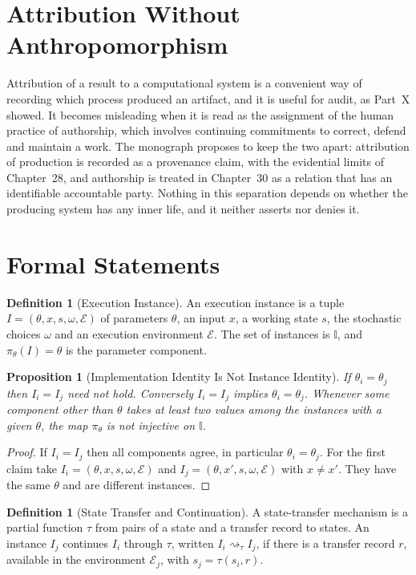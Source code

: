 \documentclass[11pt,letterpaper]{report}
\theoremstyle{plain}
\newtheorem{proposition}[theorem]{Proposition}
\theoremstyle{definition}
\newtheorem{definition}[theorem]{Definition}
\theoremstyle{remark}
\begin{document}
\section{Attribution Without Anthropomorphism}

Attribution of a result to a computational system is a convenient way of recording which process produced an artifact, and it is useful for audit, as Part~X showed. It becomes misleading when it is read as the assignment of the human practice of authorship, which involves continuing commitments to correct, defend and maintain a work. The monograph proposes to keep the two apart: attribution of production is recorded as a provenance claim, with the evidential limits of Chapter~28, and authorship is treated in Chapter~30 as a relation that has an identifiable accountable party. Nothing in this separation depends on whether the producing system has any inner life, and it neither asserts nor denies it.

\section{Formal Statements}

\begin{definition}[Execution Instance]\label{def:instance}
An execution instance is a tuple $I=(\theta,x,s,\omega,\mathcal E)$ of parameters $\theta$, an input $x$, a working state $s$, the stochastic choices $\omega$ and an execution environment $\mathcal E$. The set of instances is $\mathbb I$, and $\pi_\theta(I)=\theta$ is the parameter component.
\end{definition}

\begin{proposition}[Implementation Identity Is Not Instance Identity]\label{pr:implident}
If $\theta_i=\theta_j$ then $I_i=I_j$ need not hold. Conversely $I_i=I_j$ implies $\theta_i=\theta_j$. Whenever some component other than $\theta$ takes at least two values among the instances with a given $\theta$, the map $\pi_\theta$ is not injective on $\mathbb I$.
\end{proposition}
\begin{proof}
If $I_i=I_j$ then all components agree, in particular $\theta_i=\theta_j$. For the first claim take $I_i=(\theta,x,s,\omega,\mathcal E)$ and $I_j=(\theta,x',s,\omega,\mathcal E)$ with $x\ne x'$. They have the same $\theta$ and are different instances.
\end{proof}

\begin{definition}[State Transfer and Continuation]\label{def:continuation}
A state-transfer mechanism is a partial function $\tau$ from pairs of a state and a transfer record to states. An instance $I_j$ continues $I_i$ through $\tau$, written $I_i\rightsquigarrow_\tau I_j$, if there is a transfer record $r$, available in the environment $\mathcal E_j$, with $s_j=\tau(s_i,r)$.
\end{definition}
\end{document}
